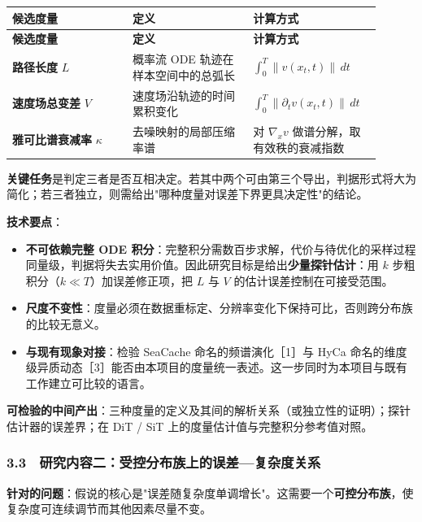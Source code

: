 \documentclass[12pt,a4paper]{ctexart}
\begin{document}
\begin{longtable}{|>{\raggedright\arraybackslash}p{0.300\linewidth}|>{\raggedright\arraybackslash}p{0.300\linewidth}|>{\raggedright\arraybackslash}p{0.300\linewidth}|}
\hline
\textbf{候选度量} & \textbf{定义} & \textbf{计算方式} \\
\hline
\endfirsthead
\hline
\textbf{候选度量} & \textbf{定义} & \textbf{计算方式} \\
\hline
\endhead
\textbf{路径长度} $L$ & 概率流 ODE 轨迹在样本空间中的总弧长 & $\int_0^T \lVert v(x_t,t)\rVert \,dt$ \\
\hline
\textbf{速度场总变差} $V$ & 速度场沿轨迹的时间累积变化 & $\int_0^T \lVert \partial_t v(x_t,t)\rVert \,dt$ \\
\hline
\textbf{雅可比谱衰减率} $\kappa$ & 去噪映射的局部压缩率谱 & 对 $\nabla_x v$ 做谱分解，取有效秩的衰减指数 \\
\hline
\end{longtable}

\textbf{关键任务}是判定三者是否互相决定。若其中两个可由第三个导出，判据形式将大为简化；若三者独立，则需给出"哪种度量对误差下界更具决定性"的结论。

\textbf{技术要点}：

\begin{itemize}[leftmargin=2em,itemsep=2pt,topsep=3pt]
  \item \textbf{不可依赖完整 ODE 积分}：完整积分需数百步求解，代价与待优化的采样过程同量级，判据将失去实用价值。因此研究目标是给出\textbf{少量探针估计}：用 $k$ 步粗积分（$k \ll T$）加误差修正项，把 $L$ 与 $V$ 的估计误差控制在可接受范围。
  \item \textbf{尺度不变性}：度量必须在数据重标定、分辨率变化下保持可比，否则跨分布族的比较无意义。
  \item \textbf{与现有现象对接}：检验 SeaCache 命名的频谱演化［1］与 HyCa 命名的维度级异质动态［3］能否由本项目的度量统一表述。这一步同时为本项目与既有工作建立可比较的语言。
\end{itemize}

\textbf{可检验的中间产出}：三种度量的定义及其间的解析关系（或独立性的证明）；探针估计器的误差界；在 DiT / SiT 上的度量估计值与完整积分参考值对照。

\subsubsection*{3.3　研究内容二：受控分布族上的误差—复杂度关系}

\textbf{针对的问题}：假说的核心是"误差随复杂度单调增长"。这需要一个\textbf{可控分布族}，使复杂度可连续调节而其他因素尽量不变。
\end{document}
